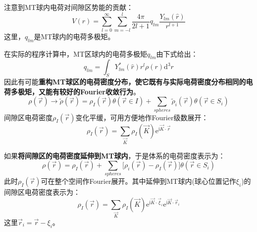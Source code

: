 注意到\textrm{MT}球内电荷对间隙区势能的贡献\cite{Jackson}：
\begin{equation}
	V(r)=\sum_{l=0}^{\infty}\sum_{m=-l}^{l}\dfrac{4\pi}{2l+1}q_{lm}\dfrac{Y_{lm}(\hat r)}{r^{l+1}}
	\label{eq_V-multi-mom}
\end{equation}
这里，$q_{lm}$是\textrm{MT}球内的电荷多极矩。

在实际的程序计算中，\textrm{MT}区球内的电荷多极矩$q_{lm}$由下式给出：
\begin{equation}
	q_{lm}=\int_{S}Y_{lm}^{\ast}(\hat r)r^l\rho(r)\mathrm{d}^3r
	\label{eq_multi-mom}
\end{equation}
因此有可能\textbf{重构\textrm{MT}球区的电荷密度分布，使它既有与实际电荷密度分布相同的电荷多极矩，又能有较好的\textrm{Fourier}收敛行为}。
\begin{equation}
	\rho(\vec r)\rightarrow\tilde\rho(\vec r)=\rho_I(\vec r)\theta(\vec r\in I)+\sum_{spheres}\tilde\rho_i(\vec r)\theta(\vec r\in S_i)
	\label{eq_pseudo-rho}
\end{equation}
间隙区电荷密度$\rho_I(\vec r)$变化平缓，可用方便地作\textrm{Fourier}级数展开：
\begin{equation}
	\rho_I(\vec r)=\sum_{\vec K}\rho_I(\vec K)\mathrm{e}^{\mathrm{i}\vec K\cdot\vec r}
	\label{eq_rho_i_four}
\end{equation}

如果\textbf{将间隙区的电荷密度延伸到\textrm{MT}球内}，于是体系的电荷密度表示为：
\begin{equation}
	\rho(\vec r)=\rho_I(\vec r)+\sum_{spheres}\big[\rho_i(\vec r)-\rho_I(\vec r)\big]\theta(\vec r\in S_i) 
	\label{eq_rho_rean}
\end{equation}
此时$\rho_I(\vec r)$可在整个空间作\textrm{Fourier}展开。其中延伸到\textrm{MT}球内(球心位置记作$\xi_i$)的间隙区电荷密度表示为：
\begin{equation}
	\rho_I(\vec r)=\sum_{\vec K}\rho_I(\vec K)\mathrm{e}^{\mathrm{i}\vec K\cdot\vec\xi_i}\mathrm{e}^{\mathrm{i}\vec K\cdot\vec r_i} 
	\label{eq_rho_i_four_i}
\end{equation}
这里$\vec r_i=\vec r-\xi_i$。

